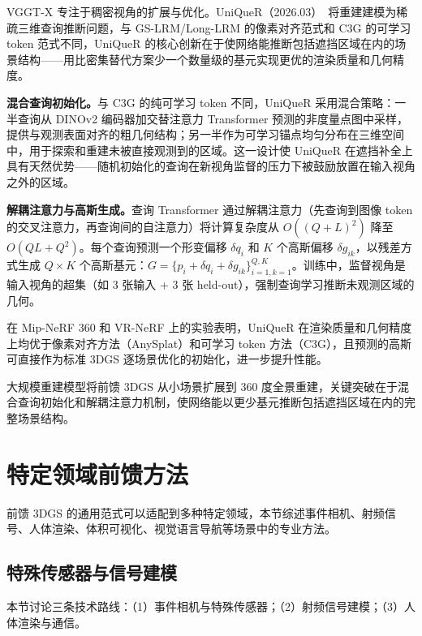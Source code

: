 VGGT-X 专注于稠密视角的扩展与优化。UniQueR（2026.03）~\cite{2603_22851}将重建建模为稀疏三维查询推断问题，与 GS-LRM/Long-LRM 的像素对齐范式和 C3G 的可学习 token 范式不同，UniQueR 的核心创新在于使网络能推断包括遮挡区域在内的场景结构——用比密集替代方案少一个数量级的基元实现更优的渲染质量和几何精度。

\textbf{混合查询初始化。}与 C3G 的纯可学习 token 不同，UniQueR 采用混合策略：一半查询从 DINOv2 编码器加交替注意力 Transformer 预测的非度量点图中采样，提供与观测表面对齐的粗几何结构；另一半作为可学习锚点均匀分布在三维空间中，用于探索和重建未被直接观测到的区域。这一设计使 UniQueR 在遮挡补全上具有天然优势——随机初始化的查询在新视角监督的压力下被鼓励放置在输入视角之外的区域。

\textbf{解耦注意力与高斯生成。}查询 Transformer 通过解耦注意力（先查询到图像 token 的交叉注意力，再查询间的自注意力）将计算复杂度从 $O((Q+L)^2)$ 降至 $O(QL+Q^2)$。每个查询预测一个形变偏移 $\delta q_i$ 和 $K$ 个高斯偏移 $\delta g_{ik}$，以残差方式生成 $Q \times K$ 个高斯基元：$G = \{p_i + \delta q_i + \delta g_{ik}\}_{i=1,k=1}^{Q,K}$。训练中，监督视角是输入视角的超集（如 3 张输入 + 3 张 held-out），强制查询学习推断未观测区域的几何。

在 Mip-NeRF 360 和 VR-NeRF 上的实验表明，UniQueR 在渲染质量和几何精度上均优于像素对齐方法（AnySplat）和可学习 token 方法（C3G），且预测的高斯可直接作为标准 3DGS 逐场景优化的初始化，进一步提升性能。

\begin{takeaway}
大规模重建模型将前馈 3DGS 从小场景扩展到 360 度全景重建，关键突破在于混合查询初始化和解耦注意力机制，使网络能以更少基元推断包括遮挡区域在内的完整场景结构。
\end{takeaway}



\section{特定领域前馈方法}
\label{sec:13_5}

前馈 3DGS 的通用范式可以适配到多种特定领域，本节综述事件相机、射频信号、人体渲染、体积可视化、视觉语言导航等场景中的专业方法。

\subsection{特殊传感器与信号建模}
\label{ss:13_5a}

本节讨论三条技术路线：（1）事件相机与特殊传感器；（2）射频信号建模；（3）人体渲染与通信。

